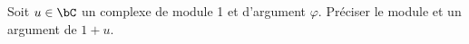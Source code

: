 
\begin{exercice}  \;
 Soit $u\in\bC$ un complexe de module 1 et d'argument $\varphi$. Pr\'eciser le module et un argument de $1+u$.
\end{exercice}